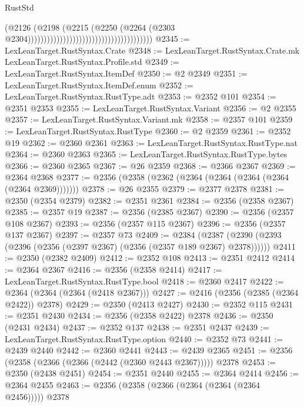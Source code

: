 \begin{lexlean}{RustStd}
\begin{coremodule}
                                                                      (@2126
                                                                        (@2198
                                                                          (@2215
                                                                            (@2250
                                                                              (@2264
                                                                                (@2303
                                                                                  @2304)))))))))))))))))))))))))))))))))))))))
@2345 := LexLeanTarget.RustSyntax.Crate
@2348 := LexLeanTarget.RustSyntax.Crate.mk LexLeanTarget.RustSyntax.Profile.std
@2349 := LexLeanTarget.RustSyntax.ItemDef
@2350 := @2 @2349
@2351 := LexLeanTarget.RustSyntax.ItemDef.enum
@2352 := LexLeanTarget.RustSyntax.RustType.adt
@2353 := @2352 @101
@2354 := @2351 @2353
@2355 := LexLeanTarget.RustSyntax.Variant
@2356 := @2 @2355
@2357 := LexLeanTarget.RustSyntax.Variant.mk
@2358 := @2357 @101
@2359 := LexLeanTarget.RustSyntax.RustType
@2360 := @2 @2359
@2361 := @2352 @19
@2362 := @2360 @2361
@2363 := LexLeanTarget.RustSyntax.RustType.nat
@2364 := @2360 @2363
@2365 := LexLeanTarget.RustSyntax.RustType.bytes
@2366 := @2360 @2365
@2367 := @26 @2359
@2368 := @2366 @2367
@2369 := @2364 @2368
@2377 := @2356 (@2358 (@2362 (@2364 (@2364 (@2364 (@2364 (@2364 @2369)))))))
@2378 := @26 @2355
@2379 := @2377 @2378
@2381 := @2350 (@2354 @2379)
@2382 := @2351 @2361
@2384 := @2356 (@2358 @2367)
@2385 := @2357 @19
@2387 := @2356 (@2385 @2367)
@2390 := @2356 (@2357 @108 @2367)
@2393 := @2356 (@2357 @115 @2367)
@2396 := @2356 (@2357 @137 @2367)
@2397 := @2357 @73
@2409 := @2384
    (@2387 (@2390 (@2393 (@2396 (@2356 (@2397 @2367) (@2356 (@2357 @189 @2367) @2378))))))
@2411 := @2350 (@2382 @2409)
@2412 := @2352 @108
@2413 := @2351 @2412
@2414 := @2364 @2367
@2416 := @2356 (@2358 @2414)
@2417 := LexLeanTarget.RustSyntax.RustType.bool
@2418 := @2360 @2417
@2422 := @2364 (@2364 (@2364 (@2418 @2367)))
@2427 := @2416 (@2356 (@2385 (@2364 @2422)) @2378)
@2429 := @2350 (@2413 @2427)
@2430 := @2352 @115
@2431 := @2351 @2430
@2434 := @2356 (@2358 @2422) @2378
@2436 := @2350 (@2431 @2434)
@2437 := @2352 @137
@2438 := @2351 @2437
@2439 := LexLeanTarget.RustSyntax.RustType.option
@2440 := @2352 @73
@2441 := @2439 @2440
@2442 := @2360 @2441
@2443 := @2439 @2365
@2451 := @2356 (@2358 (@2366 (@2366 (@2442 (@2360 @2443 @2367))))) @2378
@2453 := @2350 (@2438 @2451)
@2454 := @2351 @2440
@2455 := @2364 @2414
@2456 := @2364 @2455
@2463 := @2356 (@2358 (@2366 (@2364 (@2364 (@2364 @2456))))) @2378

\end{coremodule}
\end{lexlean}
